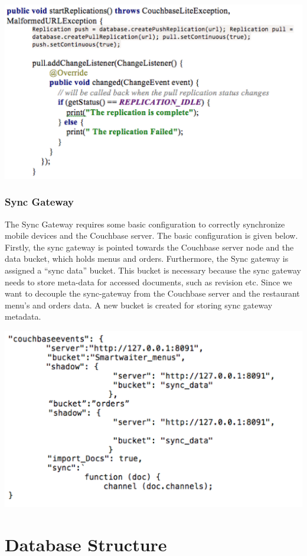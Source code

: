 \documentclass[12pt, titlepage]{article}
\begin{document}
\includegraphics[width=150mm,scale=0.5]{replications.png}

\subsubsection{Sync Gateway}

The Sync Gateway requires some basic configuration to correctly synchronize mobile devices and the Couchbase server. The basic configuration is given below. Firstly, the sync gateway is pointed towards the Couchbase server node and the data bucket, which holds menus and orders. Furthermore, the Sync gateway is assigned a “sync data” bucket. This bucket is necessary because the sync gateway needs to store meta-data for accessed documents, such as revision etc. Since we want to decouple the sync-gateway from the Couchbase server and the restaurant menu’s and orders data. A new bucket is created for storing sync gateway metadata. 

\includegraphics[width=150mm,scale=0.5]{jsonCouchbase.png}

\section{Database Structure}
\end{document}
